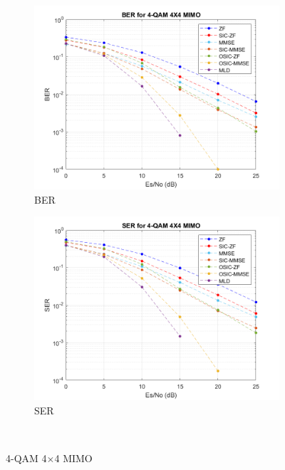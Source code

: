 \documentclass{article}
\begin{document}
\begin{figure}[H]
	\centering
	\begin{subfigure}{0.5\textwidth}
		\centerline{\includegraphics[width=1\textwidth]{BER_4x4_4qam.png}}
		\caption{BER}
	\end{subfigure}%
	\begin{subfigure}{0.5\textwidth}
		\centerline{\includegraphics[width=1\textwidth]{SER_4x4_4qam.png}}
		\caption{SER}
	\end{subfigure}\\%
	\caption{4-QAM 4$\times$4 MIMO}
\end{figure}
\end{document}

